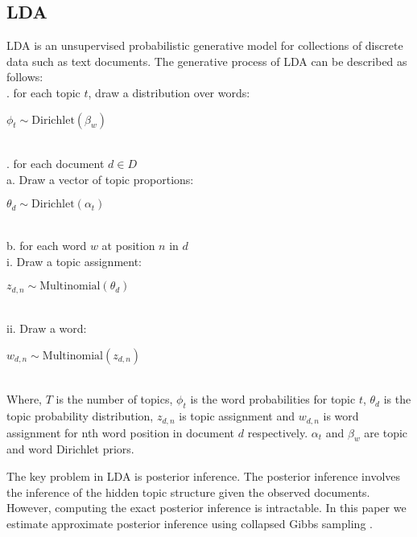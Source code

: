 \documentclass[11pt]{article}
\begin{document}
\subsection{LDA}
LDA is an unsupervised probabilistic generative model for collections of discrete data such as text documents. The generative process of LDA can be described as follows:\\
. for each topic $t$, draw a distribution over words: \begin{footnotesize}
 $\phi_t \sim \mathrm{Dirichlet}(\beta_w)$ \end{footnotesize}\\
. for each document $d \in D$\\
\indent \indent a. Draw a vector of topic proportions:\\\indent \indent \indent \begin{footnotesize}$\theta_d \sim \mathrm{Dirichlet}(\alpha_t)$\end{footnotesize}\\
\indent \indent b. for each word $w$ at position $n$ in $d$\\
\indent \indent \indent i. Draw a topic assignment:\\ \indent \indent \indent \begin{footnotesize}$z_{d,n} \sim \mathrm{Multinomial}(\theta_d)$\end{footnotesize}\\
\indent \indent \indent ii. Draw a word:\\ \indent \indent \indent \begin{footnotesize}$w_{d,n} \sim \mathrm{Multinomial}(z_{d,n})$\end{footnotesize}\\
Where, $T$ is the number of topics, $\phi_t$ is the word probabilities for topic $t$, $\theta_d$ is the topic probability distribution, $z_{d,n}$ is topic assignment and $w_{d,n}$ is word assignment for nth word position in document $d$ respectively. $\alpha_t$ and $\beta_w$ are topic and word Dirichlet priors.

The key problem in LDA is posterior inference. The posterior inference involves the
inference of the hidden topic structure given the observed documents. However, computing the
exact posterior inference is intractable. In this paper we estimate approximate posterior inference using collapsed Gibbs sampling \cite{Griffiths:Finding}.
\end{document}
